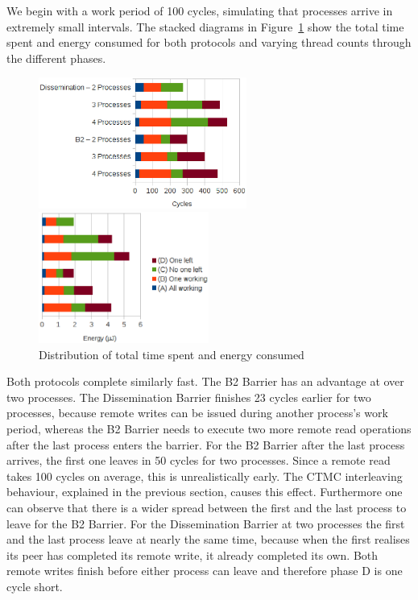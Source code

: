 \documentclass[a4paper, 10pt]{article}
\begin{document}
We begin with a work period of 100 cycles, simulating that processes arrive in extremely small intervals.
The stacked diagrams in Figure~\ref{fig:d2-work-100-partition} show the total time spent and energy consumed for both protocols and varying thread counts through the different phases.
\begin{figure}[htbp]
	\centering
	\begin{minipage}{0.54\linewidth}
		\includegraphics[height=4.3cm]{charts/d2-time-work-100-partition}
	\end{minipage}
	\begin{minipage}{0.45\linewidth}
		\includegraphics[height=4.3cm]{charts/d2-energy-work-100-partition}
	\end{minipage}
	\caption{Distribution of total time spent and energy consumed}
	\label{fig:d2-work-100-partition}
\end{figure}
Both protocols complete similarly fast. The B2 Barrier has an advantage at over two processes.
The Dissemination Barrier finishes 23 cycles earlier for two processes, because remote writes can be issued during another process's work period, whereas the B2 Barrier needs to execute two more remote read operations after the last process enters the barrier.
For the B2 Barrier after the last process arrives, the first one leaves in 50 cycles for two processes. Since a remote read takes 100 cycles on average, this is unrealistically early. The CTMC interleaving behaviour, explained in the previous section, causes this effect.
Furthermore one can observe that there is a wider spread between the first and the last process to leave for the B2 Barrier.
For the Dissemination Barrier at two processes the first and the last process leave at nearly the same time, because when the first realises its peer has completed its remote write, it already completed its own. Both remote writes finish before either process can leave and therefore phase D is one cycle short.
\end{document}
